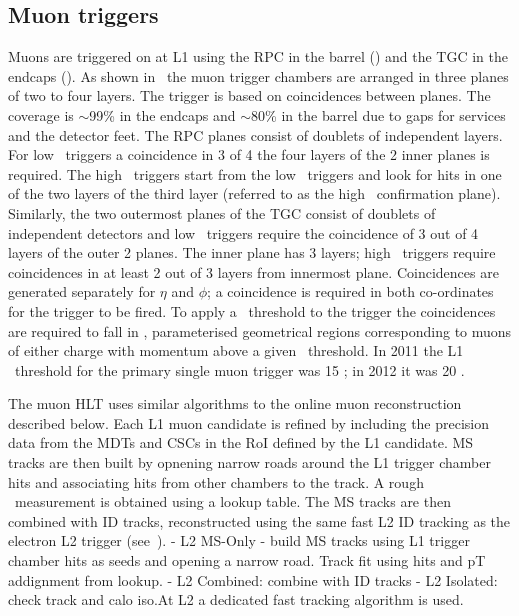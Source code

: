 \subsection{Muon triggers}
\label{sec:reco-mu-triggers}

Muons are triggered on at L1 using the RPC in the barrel () and
the TGC in the endcaps (). As shown in~ the
muon trigger chambers are arranged in three planes of two to four layers. The
trigger is based on coincidences between planes. 
The coverage is $\sim$99\% in the endcaps and $\sim$80\% in the barrel due to
gaps for services and the detector feet.
The RPC planes consist of
doublets of independent layers. For low \pt\ triggers a coincidence in 3 of 4
the four layers of the 2 inner planes is required. The high \pt\ triggers start
from the low \pt\ triggers and look for hits in one of the two layers of the
third layer (referred to as the high \pt\ confirmation plane). Similarly, the two outermost
planes of the TGC consist of doublets of independent detectors and low \pt\
triggers require the coincidence of 3 out of 4 layers of the outer 2 planes. The
inner plane has 3 layers; high \pt\ triggers require coincidences in at least 2
out of 3 layers from innermost plane. Coincidences are generated separately for
$\eta$ and $\phi$; a coincidence is required in both co-ordinates for the
trigger to be fired. To apply a \pt\ threshold to the trigger the coincidences
are required to fall in \int{roads}, parameterised geometrical regions
corresponding to muons of either charge with momentum above a given \pt\
threshold. In 2011 the L1 \pt\ threshold for the primary single muon trigger was
15 \GeV; in 2012 it was 20 \GeV.

The muon HLT uses similar algorithms to the online muon reconstruction described
below. Each L1 muon candidate is refined by including the precision
data from the MDTs and CSCs in the RoI defined by the L1 candidate. MS tracks
are then built by opnening narrow roads around the L1 trigger chamber hits and
associating hits from other chambers to the track. A rough \pt\ measurement is
obtained using a lookup table. The MS tracks are then combined with ID tracks,
reconstructed using the same fast L2 ID tracking as the electron L2 trigger
(see~\sec{reco-el-triggers}).
	- L2 MS-Only - build MS tracks using L1 trigger chamber hits as seeds and opening a narrow road. Track fit using hits and pT addignment from lookup.
	- L2 Combined: combine with ID tracks
	- L2 Isolated: check track and calo iso.At L2 a dedicated fast tracking
algorithm is used. 

